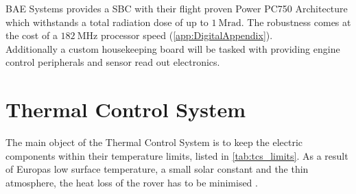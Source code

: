 BAE Systems provides a SBC with their flight proven Power PC750 Architecture which withstands a total radiation dose of up to $1~\text{Mrad}$. The robustness comes at the cost of a $182~\text{MHz}$ processor speed (\autoref{app:DigitalAppendix}). \\

Additionally a custom housekeeping board will be tasked with providing engine control peripherals and sensor read out electronics. 

\section{Thermal Control System} \label{sec:thermalcontrol}
The main object of the Thermal Control System is to keep the electric components within their temperature limits, listed in \autoref{tab:tcs_limits}.
As a result of Europas low surface temperature, a small solar constant and the thin atmosphere, the heat loss of the rover has to be minimised  \cite{Europa}.

